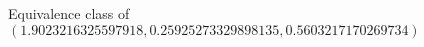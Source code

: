 \documentclass[preview]{standalone}
\begin{document}
\begin{center}
Equivalence class of $(1.9023216325597918, 0.25925273329898135, 0.5603217170269734)$
\end{center}
\end{document}
